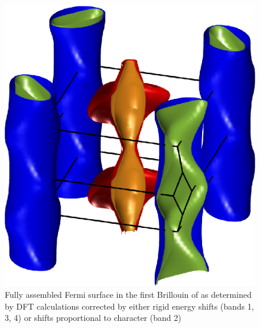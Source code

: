 \begin{figure}[htbp]
    \begin{center}
        \includegraphics[scale=0.7]{Chapter-dHvABaFe2P2/Figures/AngleDepMeasurements/BandCharacterFermiSurface/FullBandCharacterFermiSurface}
        \caption{Fully assembled Fermi surface in the first Brillouin of \BaFeP as determined by \ac{DFT} calculations corrected by either rigid energy shifts (bands 1, 3, 4) or shifts proportional to \DzTwo character (band 2)}
        \label{Fig:ResD:FullBandCharacterFermiSurface}
    \end{center}
\end{figure}

